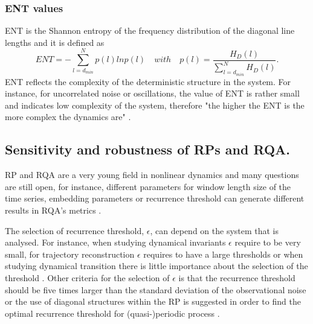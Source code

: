 \documentclass[fleqn,10pt]{wlscirep}
\begin{document}
\subsubsection*{ENT values}
ENT is the Shannon entropy of the frequency distribution of the diagonal 
line lengths and it is defined as
\begin{equation}
ENT= - \sum^{N}_{l=d_{min}} p(l) ln p(l) \quad with 
	\quad p(l)=\frac{ H_D(l) }{ \sum^{N}_{ l=d_{min} } H_D(l) }.
\end{equation}
ENT reflects the complexity of the deterministic structure in the system.
For instance, for uncorrelated noise or oscillations, 
the value of ENT is rather small and indicates low complexity of the system,
therefore "the higher the ENT is the more complex the dynamics are" 
\cite{marwan2007, marwan2015}.
%
%

 
\subsection*{Sensitivity and robustness of RPs and RQA.}
RP and RQA are a very young field in nonlinear dynamics and many questions 
are still open, for instance, different parameters for window length size 
of the time series, embedding parameters or recurrence threshold can 
generate different results in RQA's metrics \cite{marwan2011, eckmann1987}.

The selection of recurrence threshold, $\epsilon$, can depend on the system 
that is analysed. For instance, when studying dynamical invariants $\epsilon$ 
require to be very small, for trajectory reconstruction $\epsilon$ requires 
to have a large thresholds or when studying dynamical transition 
there is little importance about the selection of the threshold 
\cite{marwan2011}. Other criteria for the selection of $\epsilon$ is that 
the recurrence threshold  should be five times larger 
than the standard deviation of the observational noise
or the use of diagonal structures within the RP is suggested in order
to find the optimal recurrence threshold for (quasi-)periodic process 
\cite{marwan2011}.
\end{document}
